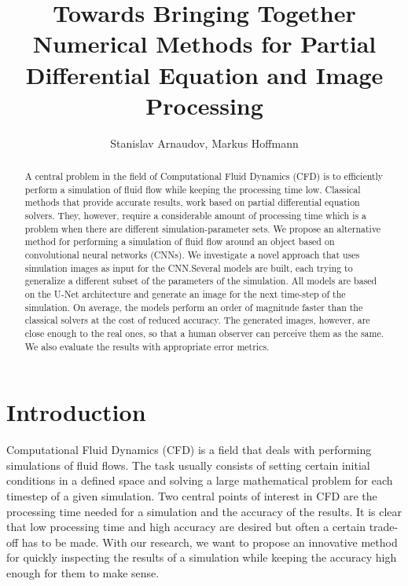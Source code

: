 \documentclass{llncs}
\begin{document}
\pagestyle{headings}
\mainmatter{}
\title{Towards Bringing Together Numerical Methods for Partial Differential Equation and Image Processing}
\author{Stanislav Arnaudov, Markus Hoffmann}

\maketitle

\begin{abstract}
  A central problem in the field of Computational Fluid Dynamics (CFD) is to efficiently perform a simulation of fluid flow while keeping the processing time low. Classical methods that provide accurate results, work based on partial differential equation solvers. They, however, require a considerable amount of processing time which is a problem when there are different simulation-parameter sets. We propose an alternative method for performing a simulation of fluid flow around an object based on convolutional neural networks (CNNs). We investigate a novel approach that uses simulation images as input for the CNN.\@ Several models are built, each trying to generalize a different subset of the parameters of the simulation. All models are based on the U-Net architecture and generate an image for the next time-step of the simulation. On average, the models perform an order of magnitude faster than the classical solvers at the cost of reduced accuracy. The generated images, however, are close enough to the real ones, so that a human observer can perceive them as the same. We also evaluate the results with appropriate error metrics.
\end{abstract}

\section{Introduction}\label{introduction}
Computational Fluid Dynamics (CFD) is a field that deals with performing simulations of fluid flows. The task usually consists of setting certain initial conditions in a defined space and solving a large mathematical problem for each timestep of a given simulation. Two central points of interest in CFD are the processing time needed for a simulation and the accuracy of the results. It is clear that low processing time and high accuracy are desired but often a certain trade-off has to be made. With our research, we want to propose an innovative method for quickly inspecting the results of a simulation while keeping the accuracy high enough for them to make sense.
\end{document}
